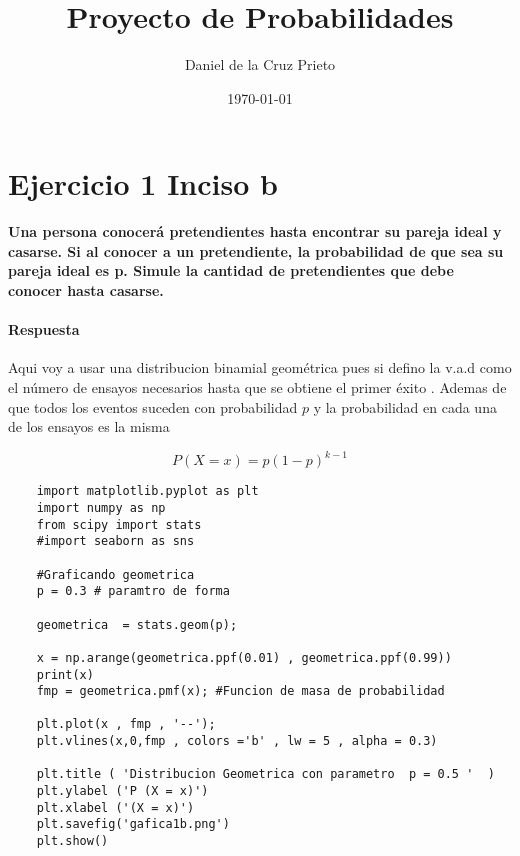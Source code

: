 \documentclass{article}
\begin{document}
    \title{Proyecto de Probabilidades} 
	\author{Daniel de la Cruz Prieto}
	\date{\today}    
    \maketitle
    
    \section*{Ejercicio 1 Inciso b }  
    {\bf Una persona conocer\'a pretendientes hasta encontrar su pareja ideal y
    casarse. Si al conocer a un pretendiente, la probabilidad de que sea su pareja ideal
    es p. Simule la cantidad de pretendientes que debe conocer hasta casarse.}
    
    \paragraph{Respuesta} 

    Aqui voy a usar una distribucion binamial geom\'etrica  pues si defino la v.a.d como 
    el n\'umero de ensayos necesarios hasta que se obtiene el primer \'exito . Ademas de 
    que todos los eventos suceden con probabilidad $p$ y la probabilidad en cada una de 
    los ensayos es la misma 

    \begin{equation}
        P \left(X = x \right) = p \left(1-p\right)^{k-1} 
    \end{equation}


    \begin{verbatim} 
    import matplotlib.pyplot as plt 
    import numpy as np 
    from scipy import stats 
    #import seaborn as sns 

    #Graficando geometrica 
    p = 0.3 # paramtro de forma 

    geometrica  = stats.geom(p); 

    x = np.arange(geometrica.ppf(0.01) , geometrica.ppf(0.99))
    print(x) 
    fmp = geometrica.pmf(x); #Funcion de masa de probabilidad 

    plt.plot(x , fmp , '--'); 
    plt.vlines(x,0,fmp , colors ='b' , lw = 5 , alpha = 0.3) 

    plt.title ( 'Distribucion Geometrica con parametro  p = 0.5 '  )
    plt.ylabel ('P (X = x)') 
    plt.xlabel ('(X = x)')
    plt.savefig('gafica1b.png')
    plt.show() 
    \end{verbatim}
    
\end{document}
